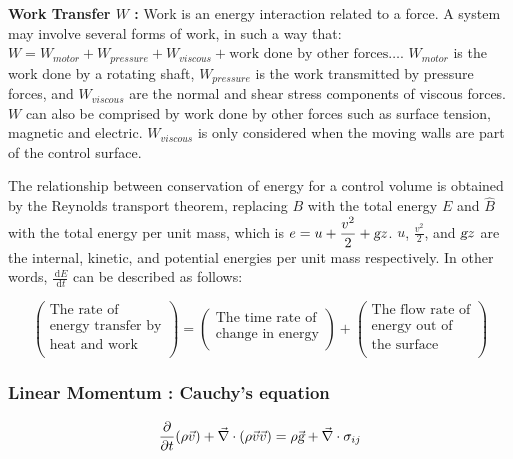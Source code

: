 \documentclass{article}
\newcommand{\ud}{\,\mathrm{d}}
\begin{document}
\textbf{Work Transfer $W$ :} Work is an energy interaction related to a force. A system may involve several forms of work, in such a way that: $\displaystyle W = W_{motor} + W_{pressure} + W_{viscous} + \textrm{work done by other forces} \dots$. $W_{motor}$ is the work done by a rotating shaft,  $W_{pressure}$ is the work transmitted by pressure forces, and $W_{viscous}$ are the normal and shear stress components of viscous forces. $W$ can also be comprised by work done by other forces such as surface tension, magnetic and electric. $W_{viscous}$ is only considered when the moving walls are part of the control surface.

The relationship between conservation of energy for a control volume is obtained by the Reynolds transport theorem, replacing $B$ with the total energy $E$ and $\hat{B}$ with the total energy per unit mass, which is $e = \displaystyle u + \frac{v^2}{2} + \textsl{g} z$. $u$, $\displaystyle \frac{v^2}{2}$, and $\textsl{g} z$ are the internal, kinetic, and potential energies per unit mass respectively. In other words, $\displaystyle \frac{\ud E}{\ud t}$ can be described as follows:

$$ \left(
    \begin{array}{c}
        \textrm{The rate of} \\
        \textrm{energy transfer by} \\
        \textrm{heat and work} \\
    \end{array}
\right) = \left(
    \begin{array}{c}
        \textrm{The time rate of} \\
        \textrm{change in energy} \\
    \end{array}
\right) + \left(
    \begin{array}{c}
        \textrm{The flow rate of} \\
        \textrm{energy out of} \\
        \textrm{the surface} \\
    \end{array}
\right) $$

\subsubsection*{Linear Momentum : Cauchy's equation}

\begin{equation}
\frac{\partial}{\partial t} (\rho \vec{v}) + \vec{\nabla} \cdot (\rho \vec{v} \vec{v}) = \rho \vec{\textsl{g}} + \vec{\nabla} \cdot \sigma_{ij}
\end{equation}
\end{document}
